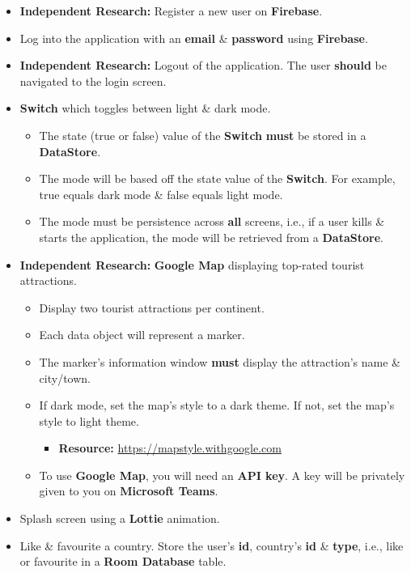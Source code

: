 \documentclass{article}
\begin{document}
\begin{itemize}
	\item \textbf{Independent Research:} Register a new user on \textbf{Firebase}.
	\item Log into the application with an \textbf{email} \& \textbf{password} using \textbf{Firebase}.
	\item \textbf{Independent Research:} Logout of the application. The user \textbf{should} be navigated to the login screen.
	\item \textbf{Switch} which toggles between light \& dark mode.
	      \begin{itemize}
		      \item The state (true or false) value of the \textbf{Switch} \textbf{must} be stored in a \textbf{DataStore}.
		      \item The mode will be based off the state value of the \textbf{Switch}. For example, true equals dark mode \& false equals light mode.
		      \item The mode must be persistence across \textbf{all} screens, i.e., if a user kills \& starts the application, the mode will be retrieved from a \textbf{DataStore}.
	      \end{itemize}
	\item \textbf{Independent Research:} \textbf{Google Map} displaying top-rated tourist attractions.
	      \begin{itemize}
		      \item Display two tourist attractions per continent.
		      \item Each data object will represent a marker.
		      \item The marker's information window \textbf{must} display the attraction's name \& city/town.
		      \item If dark mode, set the map's style to a dark theme. If not, set the map's style to light theme.
		            \begin{itemize}
			            \item \textbf{Resource:} \small\href{https://mapstyle.withgoogle.com}{https://mapstyle.withgoogle.com}
		            \end{itemize}
		      \item To use \textbf{Google Map}, you will need an \textbf{API key}. A key will be privately given to you on \textbf{Microsoft Teams}.
	      \end{itemize}
	\item Splash screen using a \textbf{Lottie} animation.
	\item Like \& favourite a country. Store the user's \textbf{id}, country's \textbf{id} \& \textbf{type}, i.e., like or favourite in a \textbf{Room Database} table. 

\end{itemize}
\end{document}

